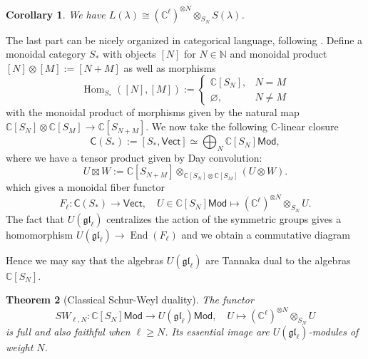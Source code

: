 \documentclass[11pt]{report}
\newtheorem{theorem}{Theorem}[section]
\newtheorem{corollary}[theorem]{Corollary}
\theoremstyle{definition}
\theoremstyle{remark}
\theoremstyle{remark}
\newcommand{\Hom}{\operatorname{Hom}}
\newcommand{\End}{\operatorname{End}}
\newcommand{\N}{\mathbb{N}}
\newcommand{\C}{\mathbb{C}}
\begin{document}
\begin{corollary}
We have $L(\lambda) \cong (\C^\ell)^{\otimes N} \otimes_{S_N} S(\lambda)$.
\end{corollary}

The last part can be nicely organized in categorical language, following \cite{article:davydov:2010}. Define a monoidal category $S_*$ with objects $[N]$ for $N \in \N$ and monoidal product $[N] \otimes [M] := [N+M]$ as well as morphisms
\begin{equation*}
\Hom_{S_*}([N],[M]) :=
\begin{cases}
\C[S_N], & N = M \\
\varnothing, & N \neq M
\end{cases}
\end{equation*}
with the monoidal product of morphisms given by the natural map $\C[S_N] \otimes \C[S_M] \to \C[S_{N+M}]$. We now take the following $\C$-linear closure
\begin{equation*}
\mathsf{C}(S_*) := [S_*,\mathsf{Vect}] \simeq \bigoplus_N \C[S_N]\mathsf{Mod},
\end{equation*}
where we have a tensor product given by Day convolution:
\begin{equation*}
U \boxtimes W := \C[S_{N+M}] \otimes_{\C[S_N] \otimes \C[S_M]} (U \otimes W).
\end{equation*}
which gives a monoidal fiber functor
\begin{equation*}
F_\ell: \mathsf{C}(S_*) \to \mathsf{Vect}, \quad U \in \C[S_N]\mathsf{Mod} \mapsto (\C^\ell)^{\otimes N} \otimes_{S_N} U.
\end{equation*}
The fact that $U(\mathfrak{gl}_\ell)$ centralizes the action of the symmetric groups gives a homomorphism $U(\mathfrak{gl}_\ell) \to \End(F_\ell)$ and we obtain a commutative diagram
\begin{center}
\end{center}
Hence we may say that the algebras $U(\mathfrak{gl}_\ell)$ are Tannaka dual to the algebras $\C[S_N]$.

\begin{theorem}[Classical Schur-Weyl duality]
The functor
\begin{equation*}
SW_{\ell,N}: \C[S_N]\mathsf{Mod} \to U(\mathfrak{gl}_\ell)\mathsf{Mod}, \quad U \mapsto (\C^\ell)^{\otimes N} \otimes_{S_N} U
\end{equation*}
is full and also faithful when $\ell \geq N$. Its essential image are $U(\mathfrak{gl}_\ell)$-modules of weight $N$.
\end{theorem}
\end{document}

